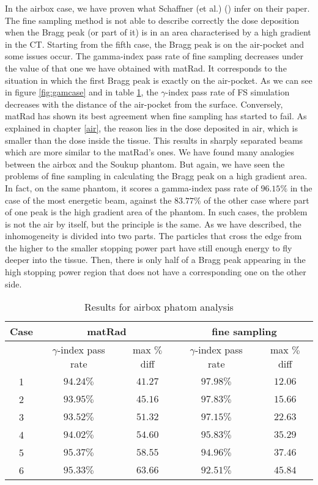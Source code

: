 \documentclass[12pt, a4paper, twoside]{book}
\begin{document}
In the airbox case, we have proven what Schaffner (et al.) (\cite{schaf:pba}) infer on their paper. The fine sampling method is not able to describe correctly the dose deposition when the Bragg peak (or part of it) is in an area characterised by a high gradient in the CT. Starting from the fifth case, the Bragg peak is on the air-pocket and some issues occur. The gamma-index pass rate of fine sampling decreases under the value of that one we have obtained with matRad. It corresponds to the situation in which the first Bragg peak is exactly on the air-pocket. As we can see in figure \ref{fig:gamcase} and in table \ref{tab:air}, the $\gamma$-index pass rate of FS simulation decreases with the distance of the air-pocket from the surface. Conversely, matRad has shown its best agreement when fine sampling has started to fail. As explained in chapter \ref{air}, the reason lies in the dose deposited in air, which is smaller than the dose inside the tissue. This results in sharply separated beams which are more similar to the matRad's ones. We have found many analogies between the airbox and the Soukup phantom. But again, we have seen the problems of fine sampling in calculating the Bragg peak on a high gradient area. In fact, on the same phantom, it scores a gamma-index pass rate of $96.15\%$ in the case of the most energetic beam, against the $83.77\%$ of the other case where part of one peak is the high gradient area of the phantom. In such cases, the problem is not the air by itself, but the principle is the same.
As we have described, the inhomogeneity is divided into two parts. The particles that cross the edge from the higher to the smaller stopping power part have still enough energy to fly deeper into the tissue. Then, there is only half of a Bragg peak appearing in the high stopping power region that does not have a corresponding one on the other side.

\begin{table}[t]
\centering
\begin{tabular}{ccccc}
\toprule
Case & \multicolumn{2}{c}{matRad} & \multicolumn{2}{c}{fine sampling}\\
\midrule
 & $\gamma$-index pass rate & max $\%$ diff & $\gamma$-index pass rate & max $\%$ diff\\
\midrule
1 & $94.24\%$ & $41.27$ & $97.98\%$ & $12.06$\\
2 & $93.95\%$ & $45.16$ & $97.83\%$ & $15.66$\\
3 & $93.52\%$ & $51.32$ & $97.15\%$ & $22.63$\\
4 & $94.02\%$ & $54.60$ & $95.83\%$ & $35.29$\\
5 & $95.37\%$ & $58.55$ & $94.96\%$ & $37.46$\\
6 & $95.33\%$ & $63.66$ & $92.51\%$ & $45.84$\\
\bottomrule
\end{tabular}
\caption{Results for airbox phatom analysis}
\label{tab:air}
\end{table}
\end{document}
